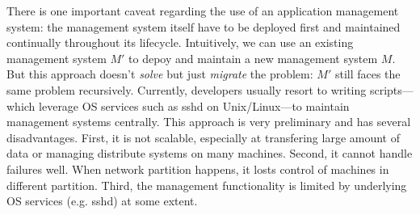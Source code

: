 There is one important caveat regarding the use of an
application management system: the management system itself
have to be deployed first and maintained continually
throughout its lifecycle. Intuitively, we can use an
existing management system $M'$ to depoy and maintain a new
management system $M$. But this approach doesn't
\emph{solve} but just \emph{migrate} the problem: $M'$ still
faces the same problem recursively.  Currently, developers
usually resort to writing scripts---which leverage OS
services such as sshd on Unix/Linux---to maintain management
systems centrally. This approach is very preliminary and has
several disadvantages.  First, it is not scalable,
especially at transfering large amount of data or managing
distribute systems on many machines. Second, it cannot
handle failures well. When network partition happens, it
losts control of machines in different partition. Third, the
management functionality is limited by underlying OS
services (e.g. sshd) at some extent.

% 
% 
% 
% 
% 
% 
% 
% 
% 
% 
% 

